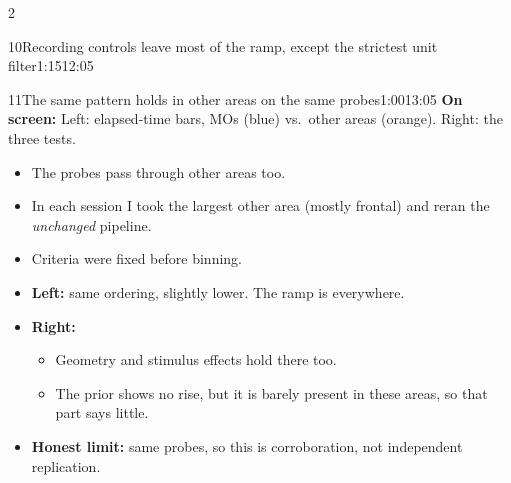 \documentclass[10pt]{article}
\newcommand{\point}[1]{{\color{ink}\textbf{On screen:} #1}\par}
\begin{document}
\begin{multicols}{2}
\begin{slidebox}{10}{Recording controls leave most of the ramp, except the strictest unit filter}{1:15}{12:05}
\end{slidebox}
\begin{slidebox}{11}{The same pattern holds in other areas on the same probes}{1:00}{13:05}
\point{Left: elapsed-time bars, MOs (blue) vs.\ other areas (orange). Right: the three tests.}
\begin{itemize}
\item The probes pass through other areas too.
\item In each session I took the largest other area (mostly frontal) and reran the \emph{unchanged} pipeline.
\item Criteria were fixed before binning.
\item \textbf{Left:} same ordering, slightly lower. The ramp is everywhere.
\item \textbf{Right:}
  \begin{itemize}
  \item Geometry and stimulus effects hold there too.
  \item The prior shows no rise, but it is barely present in these areas, so that part says little.
  \end{itemize}
\item \textbf{Honest limit:} same probes, so this is corroboration, not independent replication.
\end{itemize}


\end{slidebox}
\end{multicols}
\end{document}
